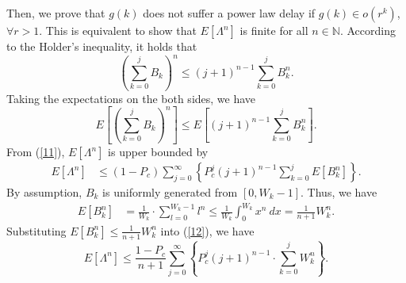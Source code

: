 \documentclass[journal]{IEEEtran}
\begin{document}
Then, we prove that $g(k)$ does not suffer a power law delay if $g(k)\in o\left(r^k\right)$, $\forall r>1$. This is equivalent to show that $E\left[\Lambda^n\right]$ is finite for all $n\in \mathbb{N}$. According to the Holder's inequality, it holds that
\begin{equation}
\left(\sum_{k=0}^j B_k\right)^n\leq \left(j+1\right)^{n-1}\sum_{k=0}^jB_k^n.
\end{equation}
Taking the expectations on the both sides, we have
\begin{equation}
E\left[\left(\sum_{k=0}^j B_k\right)^n\right]\leq E\left[\left(j+1\right)^{n-1}\sum_{k=0}^{j}B_k^n \right].
\end{equation}
From (\ref{11}), $E[\Lambda^n]$ is upper bounded by
\begin{equation}
\label{12}
\begin{aligned}
E[\Lambda^n]&\leq\left(1-P_c\right)\sum_{j=0}^{\infty}\left\{P_c^j\left(j+1\right)^{n-1} \sum_{k=0}^{j}E\left[B_k^n \right]\right\}.
\end{aligned}
\end{equation}
By assumption, $B_k$ is uniformly generated from $\left[0,W_k-1\right]$. Thus, we have
\begin{equation}
\begin{aligned}
E\left[B_k^n \right]&=\frac{1}{W_k}\cdot \sum_{l=0}^{W_k-1} l^n \leq \frac{1}{W_k} \int_{0}^{W_k}x^n\ dx = \frac{1}{n+1}W_k^{n}.
\end{aligned}
\end{equation}
Substituting $E\left[B_k^n \right]\leq \frac{1}{n+1}W_k^{n}$ into (\ref{12}), we have
\begin{equation}
\label{74}
E[\Lambda^n]\leq\frac{1-P_c}{n+1}\sum_{j=0}^{\infty}\left\{P_c^j\left(j+1\right)^{n-1}\cdot \sum_{k=0}^{j}W_k^{n}\right\}.
\end{equation}
\end{document}
